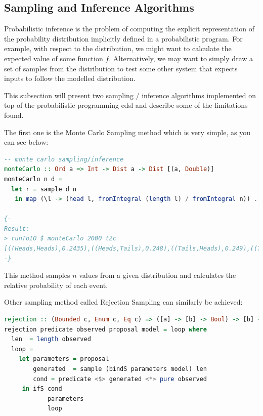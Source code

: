 \documentclass[
  oneside,
  11pt, a4paper,
  footinclude=true,
  headinclude=true,
  cleardoublepage=empty
]{scrbook}
\theoremstyle{definition}
\theoremstyle{definition}
\begin{document}
    \subsection{Sampling and Inference Algorithms}
    
    Probabilistic inference is the problem of computing the explicit representation of the probability distribution implicitly defined in a probabilistic program. For example, with respect to the distribution, we might want to calculate the expected value of some function $f$. Alternatively, we may want to simply draw a set of samples from the distribution to test some other system that expects inputs to follow the modelled distribution.
    
    This subsection will present two sampling / inference algorithms implemented on top of the probabilistic programming \gls{edsl} and describe some of the limitations found.
    
    The first one is the Monte Carlo Sampling method which is very simple, as you can see below:
    
    \begin{lstlisting}[language=Haskell, caption={Partial monadic bind function},captionpos=b]
-- monte carlo sampling/inference
monteCarlo :: Ord a => Int -> Dist a -> Dist [(a, Double)]
monteCarlo n d =
  let r = sample d n
   in map (\l -> (head l, fromIntegral (length l) / fromIntegral n)) . group . sort <$> r

{-
Result:
> runToIO $ monteCarlo 2000 t2c
[((Heads,Heads),0.2435),((Heads,Tails),0.248),((Tails,Heads),0.249),((Tails,Tails),0.2595)]
-}
    \end{lstlisting}
    
    This method samples $n$ values from a given distribution and calculates the relative probability of each event.
    
    Other sampling method called Rejection Sampling \citep{jtobin} can similarly be achieved:
    
    \begin{lstlisting}[language=Haskell, caption={Partial monadic bind function},captionpos=b]
rejection :: (Bounded c, Enum c, Eq c) => ([a] -> [b] -> Bool) -> [b] -> Dist c -> (c -> Dist a) -> Dist c
rejection predicate observed proposal model = loop where
  len  = length observed
  loop =
    let parameters = proposal
        generated  = sample (bindS parameters model) len
        cond = predicate <$> generated <*> pure observed
     in ifS cond
            parameters
            loop
    \end{lstlisting}
    
\end{document}
